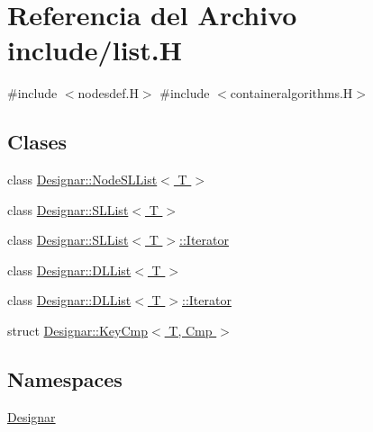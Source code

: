 \hypertarget{list_8_h}{}\section{Referencia del Archivo include/list.H}
\label{list_8_h}
{\ttfamily \#include $<$nodesdef.\+H$>$}\newline
{\ttfamily \#include $<$containeralgorithms.\+H$>$}\newline
\subsection*{Clases}
\begin{DoxyCompactItemize}
\item 
class \hyperlink{class_designar_1_1_node_s_l_list}{Designar\+::\+Node\+S\+L\+List$<$ T $>$}
\item 
class \hyperlink{class_designar_1_1_s_l_list}{Designar\+::\+S\+L\+List$<$ T $>$}
\item 
class \hyperlink{class_designar_1_1_s_l_list_1_1_iterator}{Designar\+::\+S\+L\+List$<$ T $>$\+::\+Iterator}
\item 
class \hyperlink{class_designar_1_1_d_l_list}{Designar\+::\+D\+L\+List$<$ T $>$}
\item 
class \hyperlink{class_designar_1_1_d_l_list_1_1_iterator}{Designar\+::\+D\+L\+List$<$ T $>$\+::\+Iterator}
\item 
struct \hyperlink{struct_designar_1_1_key_cmp}{Designar\+::\+Key\+Cmp$<$ T, Cmp $>$}
\end{DoxyCompactItemize}
\subsection*{Namespaces}
\begin{DoxyCompactItemize}
\item 
 \hyperlink{namespace_designar}{Designar}
\end{DoxyCompactItemize}
